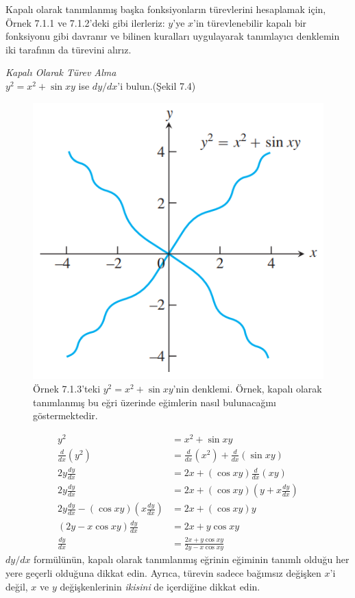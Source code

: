 Kapalı olarak tanımlanmış başka fonksiyonların türevlerini hesaplamak için, Örnek 7.1.1 ve 7.1.2'deki gibi ilerleriz: $y$'ye $x$'in türevlenebilir kapalı bir fonksiyonu gibi davranır ve bilinen kuralları uygulayarak tanımlayıcı denklemin iki tarafının da türevini alırız.
\begin{ornek}\textit{Kapalı Olarak Türev Alma}\\
	$y^2 = x^2 +\sin{xy}$ ise $ dy/dx$'i bulun.(Şekil 7.4)
\begin{figure}[H]
	\centering
	\includegraphics[width=0.5\linewidth]{kapaliturev4.png}
	\caption{Örnek 7.1.3'teki $y^2=x^2+\sin{xy}$'nin denklemi. Örnek, kapalı olarak tanımlanmış bu eğri üzerinde eğimlerin nasıl bulunacağını göstermektedir.}
	\label{fig:ornekresim}
\end{figure}
\end{ornek}
\begin{cozum}
	\begin{equation*}
	\begin{split}
	y^2&=x^2+\sin{xy}\\
	\frac{d}{dx}(y^2)&=\frac{d}{dx}(x^2)+\frac{d}{dx}(\sin{xy})\\
	2y \frac{dy}{dx}&=2x+(\cos{xy})\frac{d}{dx}(xy)\\
	2y \frac{dy}{dx}&=2x+(\cos{xy})\left(y+x \frac{dy}{dx}\right)\\
	2y \frac{dy}{dx}-(\cos{xy})\left(x \frac{dy}{dx}\right)&=2x+(\cos{xy})y\\
	(2y-x \cos{xy}) \frac{dy}{dx}&= 2x+y \cos{xy}\\
	\frac{dy}{dx}&=\frac{2x+y\cos{xy}}{2y-x\cos{xy}}
	\end{split}
	\end{equation*}
$dy/dx$ formülünün, kapalı olarak tanımlanmış eğrinin eğiminin tanımlı olduğu her yere geçerli olduğuna dikkat edin. Ayrıca, türevin sadece bağımsız değişken $x$'i değil, $x$ ve $y$ değişkenlerinin \textit{ikisini} de içerdiğine dikkat edin.
\end{cozum}\\

